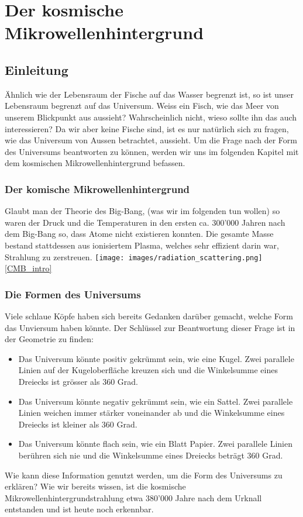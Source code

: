
	\chapter{Der kosmische Mikrowellenhintergrund\label{chapter:thema}}
	\begin{refsection}
		
		\printbibliography[heading=subbibliography]
	\end{refsection}
	\section{Einleitung}
	Ähnlich wie der Lebensraum der Fische auf das Wasser begrenzt ist, so ist unser Lebensraum begrenzt auf das Universum.
	Weiss ein Fisch, wie das Meer von unserem Blickpunkt aus aussieht?
	Wahrscheinlich nicht, wieso sollte ihn das auch interessieren?
	Da wir aber keine Fische sind, ist es nur natürlich sich zu fragen, wie das Universum von Aussen betrachtet, aussieht.
	Um die Frage nach der Form des Universums beantworten zu können, werden wir uns im folgenden Kapitel mit dem kosmischen Mikrowellenhintergrund befassen.
	
	\subsection{Der komische Mikrowellenhintergrund}
	Glaubt man der Theorie des Big-Bang, (was wir im folgenden tun wollen) so waren der Druck und die Temperaturen in den ersten ca. 300'000 Jahren nach dem Big-Bang so, dass Atome nicht existieren konnten. Die gesamte Masse bestand stattdessen aus ionisiertem Plasma, welches sehr effizient darin war, Strahlung zu zerstreuen.
	\texttt{[image: images/radiation\_scattering.png]}
	\ref{CMB_intro}
	
	\subsection{Die Formen des Universums}
	Viele schlaue Köpfe haben sich bereits Gedanken darüber gemacht, welche Form das Unviersum haben könnte. Der Schlüssel zur Beantwortung dieser Frage ist in der Geometrie zu finden:
	\begin{itemize}
		\item Das Universum könnte positiv gekrümmt sein, wie eine Kugel.
		Zwei parallele Linien auf der Kugeloberfläche kreuzen sich und die Winkelsumme eines Dreiecks ist grösser als 360 Grad.
		\item Das Universum könnte negativ gekrümmt sein, wie ein Sattel.
		Zwei parallele Linien weichen immer stärker voneinander ab und die Winkelsumme eines Dreiecks ist kleiner als 360 Grad.
		\item Das Universum könnte flach sein, wie ein Blatt Papier.
		Zwei parallele Linien berühren sich nie und die Winkelsumme eines Dreiecks beträgt 360 Grad.
	\end{itemize}
	Wie kann diese Information genutzt werden, um die Form des Universums zu erklären?
	Wie wir bereits wissen, ist die kosmische Mikrowellenhintergrundstrahlung etwa 380'000 Jahre nach dem Urknall entstanden und ist heute noch erkennbar. 
	
